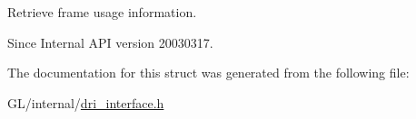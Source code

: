 Retrieve frame usage information.

\begin{DoxySince}{Since}
Internal A\+PI version 20030317. 
\end{DoxySince}


The documentation for this struct was generated from the following file\+:\begin{DoxyCompactItemize}
\item 
G\+L/internal/\hyperlink{dri__interface_8h}{dri\+\_\+interface.\+h}\end{DoxyCompactItemize}
